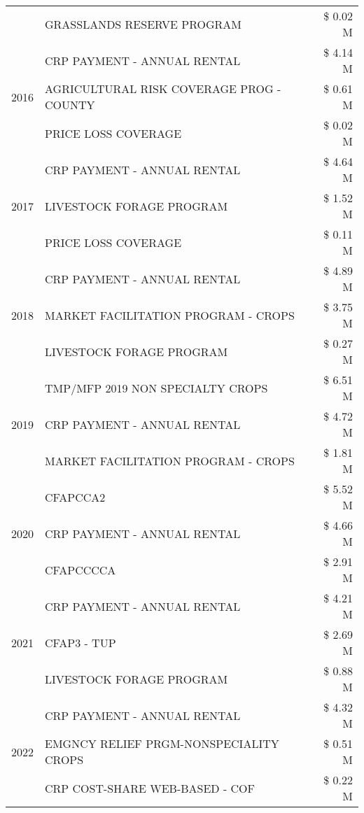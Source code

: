 \begin{tabular}{llr}
 & GRASSLANDS RESERVE PROGRAM & \$ 0.02 M \\
\cline{1-3}
\multirow[t]{3}{*}{2016} & CRP PAYMENT - ANNUAL RENTAL & \$ 4.14 M \\
 & AGRICULTURAL RISK COVERAGE PROG - COUNTY & \$ 0.61 M \\
 & PRICE LOSS COVERAGE & \$ 0.02 M \\
\cline{1-3}
\multirow[t]{3}{*}{2017} & CRP PAYMENT - ANNUAL RENTAL & \$ 4.64 M \\
 & LIVESTOCK FORAGE PROGRAM & \$ 1.52 M \\
 & PRICE LOSS COVERAGE & \$ 0.11 M \\
\cline{1-3}
\multirow[t]{3}{*}{2018} & CRP PAYMENT - ANNUAL RENTAL & \$ 4.89 M \\
 & MARKET FACILITATION PROGRAM - CROPS & \$ 3.75 M \\
 & LIVESTOCK FORAGE PROGRAM & \$ 0.27 M \\
\cline{1-3}
\multirow[t]{3}{*}{2019} & TMP/MFP 2019 NON SPECIALTY CROPS & \$ 6.51 M \\
 & CRP PAYMENT - ANNUAL RENTAL & \$ 4.72 M \\
 & MARKET FACILITATION PROGRAM - CROPS & \$ 1.81 M \\
\cline{1-3}
\multirow[t]{3}{*}{2020} & CFAPCCA2 & \$ 5.52 M \\
 & CRP PAYMENT - ANNUAL RENTAL & \$ 4.66 M \\
 & CFAPCCCCA & \$ 2.91 M \\
\cline{1-3}
\multirow[t]{3}{*}{2021} & CRP PAYMENT - ANNUAL RENTAL & \$ 4.21 M \\
 & CFAP3 - TUP & \$ 2.69 M \\
 & LIVESTOCK FORAGE PROGRAM & \$ 0.88 M \\
\cline{1-3}
\multirow[t]{3}{*}{2022} & CRP PAYMENT - ANNUAL RENTAL & \$ 4.32 M \\
 & EMGNCY RELIEF PRGM-NONSPECIALITY CROPS & \$ 0.51 M \\
 & CRP COST-SHARE WEB-BASED - COF & \$ 0.22 M \\
\cline{1-3}
\bottomrule
\end{tabular}
